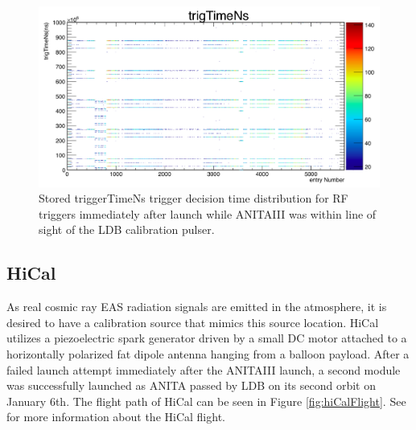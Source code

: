	\begin{figure}
		\includegraphics[width=\textwidth]{figures/mcmTrigTimeNs}
		\caption{Stored triggerTimeNs trigger decision time distribution for RF triggers immediately after launch while ANITAIII was within line of sight of the LDB calibration pulser.}
		\label{fig:mcmTrigTimeNs}
	\end{figure}		

	
		
		
		
	\subsection{HiCal}
		As real cosmic ray EAS radiation signals are emitted in the atmosphere, it is desired to have a calibration source that mimics this source location.  HiCal utilizes a piezoelectric spark generator driven by a small DC motor attached to a horizontally polarized fat dipole antenna hanging from a balloon payload.  After a failed launch attempt immediately after the ANITAIII launch, a second module was successfully launched as ANITA passed by LDB on its second orbit on January 6th.  The flight path of HiCal can be seen in Figure \ref{fig:hiCalFlight}.  See \cite{HiCal} for more information about the HiCal flight.

